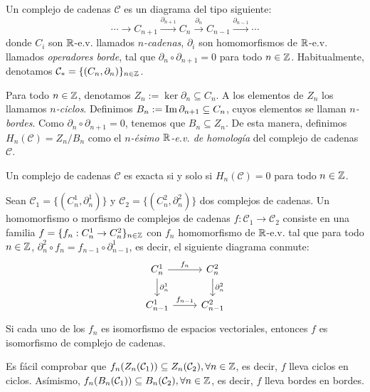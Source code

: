 \documentclass[HS.tex]{subfiles}
\begin{document}
\begin{defi}
Un complejo de cadenas $\mathcal{C}$ es un diagrama del tipo siguiente:
\[ \cdots \rightarrow C_{n+1} \xrightarrow{\partial_{n+1}} C_n \xrightarrow{\partial_n} C_{n-1} \xrightarrow{\partial_{n-1}} \cdots \]
donde $C_i$ son $\mathbb{R}$-e.v. llamados \emph{$n$-cadenas}, $\partial_i$ son homomorfismos de $\mathbb{R}$-e.v. llamados \emph{operadores borde}, tal que $\partial_n \circ \partial_{n+1} = 0$ para todo $n \in \mathbb{Z}$. Habitualmente, denotamos $\mathcal{C}_* = \{(C_n,\partial_n)\}_{n \in \mathbb{Z}}$.

Para todo $n \in \mathbb{Z}$, denotamos $Z_n := \ker \partial_n \subseteq C_n$. A los elementos de $Z_n$ los llamamos \emph{$n$-ciclos}.
Definimos $B_n := \operatorname{Im} \partial_{n+1} \subseteq C_n$, cuyos elementos se llaman \emph{$n$-bordes}.
Como $\partial_n \circ \partial_{n+1} = 0$, tenemos que $B_n \subseteq Z_n$.
De esta manera, definimos $H_n(\mathcal{C}) = Z_n / B_n$ como el \emph{$n$-ésimo $\mathbb{R}$-e.v. de homología} del complejo de cadenas $\mathcal{C}$.
\end{defi}

\begin{nota}
Un complejo de cadenas $\mathcal{C}$ es exacta si y solo si $H_n(\mathcal{C})=0$ para todo $n\in\mathbb{Z}$. 
\end{nota}

\begin{defi}
Sean $\mathcal{C}_1=\{(C_n^1,\partial_n^1)\}$ y $\mathcal{C}_2=\{(C_n^2,\partial_n^2)\}$ dos complejos de cadenas. Un homomorfismo o morfismo de complejos de cadenas $f : \mathcal{C}_1 \to \mathcal{C}_2$ consiste en una familia $f = \{f_n : C_n^1 \to C_n^2\}_{n \in \mathbb{Z}}$ con $f_n$ homomorfismo de $\mathbb{R}$-e.v. tal que para todo $n \in \mathbb{Z}$, $\partial_n^2 \circ f_n = f_{n-1} \circ \partial_{n-1}^1$, es decir, el siguiente diagrama conmute:
\[\begin{tikzcd}
	C_n^1 \arrow[r,"f_n"] \arrow[d,"\partial_n^1"] & C_n^2 \arrow[d,"\partial_n^2"]\\
	C_{n-1}^1 \arrow[r,"f_{n-1}"] & C_{n-1}^2
\end{tikzcd}\]
Si cada uno de los $f_n$ es isomorfismo de espacios vectoriales, entonces $f$ es isomorfismo de complejo de cadenas.
\end{defi}

\begin{nota}
Es fácil comprobar que $f_n(Z_n(\mathcal{C}_1))\subseteq Z_n(\mathcal{C}_2),\forall n\in\mathbb{Z}$, es decir, $f$ lleva ciclos en ciclos. Asímismo, $f_n(B_n(\mathcal{C}_1))\subseteq B_n(\mathcal{C}_2),\forall n\in\mathbb{Z}$, es decir, $f$ lleva bordes en bordes.
\end{nota}
\end{document}
